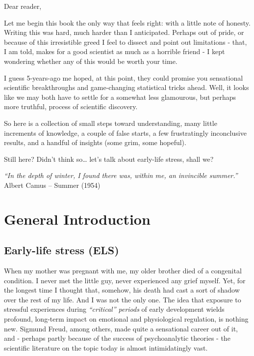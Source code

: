 \documentclass[
  letterpaper,
  DIV=11,
  numbers=noendperiod]{scrreport}
\makeatletter
\renewcommand\part[1]{ %


    \def\temp{#1} %

    \ifx\temp\empty
    \else
      \if@openright\cleardoublepage\else\clearpage\fi
      \thispagestyle{plain}
      \vspace*{4\baselineskip} %

      \addcontentsline{toc}{part}{#1} %
      
      \vspace*{2\baselineskip} %
      {\centering\normalfont\Huge\bfseries #1\par}
      \vskip 3\baselineskip
    \fi
}
\newenvironment{quotify}
{
  \vspace*{\fill} %
  \begin{flushright} %
}
{
  \end{flushright}
  \vspace*{\fill} %
}
\makeatother
\begin{document}
Dear reader,

Let me begin this book the only way that feels right: with a little note
of honesty. Writing this was hard, much harder than I anticipated.
Perhaps out of pride, or because of this irresistible greed I feel to
dissect and point out limitations - that, I am told, makes for a good
scientist as much as a horrible friend - I kept wondering whether any of
this would be worth your time.

I guess 5-years-ago me hoped, at this point, they could promise you
sensational scientific breakthroughs and game-changing statistical
tricks ahead. Well, it looks like we may both have to settle for a
somewhat less glamourous, but perhaps more truthful, process of
scientific discovery.

So here is a collection of small steps toward understanding, many little
increments of knowledge, a couple of false starts, a few frustratingly
inconclusive results, and a handful of insights (some grim, some
hopeful).

Still here? Didn't think so\ldots{} let's talk about early-life stress,
shall we?

\newpage

\begin{quotify}
\emph{``In the depth of winter, I found there was, within me, an
invincible summer.''} \newline Albert Camus -- Summer (1954)
\end{quotify}

\part{}

\chapter{General Introduction}\label{sec-chapter1}

\section{Early-life stress (ELS)}\label{early-life-stress-els}

When my mother was pregnant with me, my older brother died of a
congenital condition. I never met the little guy, never experienced any
grief myself. Yet, for the longest time I thought that, somehow, his
death had cast a sort of shadow over the rest of my life. And I was not
the only one. The idea that exposure to stressful experiences during
\emph{``critical'' periods} of early development wields profound,
long-term impact on emotional and physiological regulation, is nothing
new. Sigmund Freud, among others, made quite a sensational career out of
it, and - perhaps partly because of the success of psychoanalytic
theories - the scientific literature on the topic today is almost
intimidatingly vast.
\end{document}
